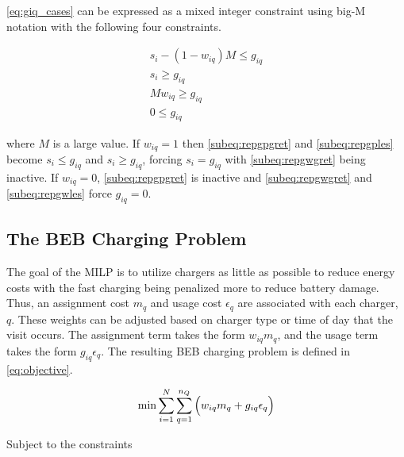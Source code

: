 \documentclass[11pt,a4paper,final]{article}
\begin{document}
\autoref{eq:giq_cases} can be expressed as a mixed integer constraint using big-M notation with the following four
constraints.

\begin{subequations}
    \label{eq:slack_gain}
\begin{align}
    s_i - (1 - w_{iq})M \leq g_{iq}  \label{subeq:repgpgret} \\
    s_i \geq g_{iq}                 \label{subeq:repgples} \\
    Mw_{iq} \geq g_{iq}              \label{subeq:repgwgret} \\
    0 \leq g_{iq}                   \label{subeq:repgwles}
\end{align}
\end{subequations}

\noindent
where \(M\) is a large value. If \(w_{iq} = 1\) then \autoref{subeq:repgpgret} and \autoref{subeq:repgples} become \(s_i \leq
g_{iq}\) and \(s_i \geq g_{iq}\), forcing \(s_i = g_{iq}\) with \autoref{subeq:repgwgret} being inactive. If \(w_{iq} = 0\),
\autoref{subeq:repgpgret} is inactive and \autoref{subeq:repgwgret} and \autoref{subeq:repgwles} force \(g_{iq} = 0\).

\subsection{The BEB Charging Problem}
\label{sec:BEB_MILP}
The goal of the MILP is to utilize chargers as little as possible to reduce energy costs with the fast charging being
penalized more to reduce battery damage. Thus, an assignment cost \(m_q\) and usage cost \(\epsilon_q\) are associated with each
charger, \(q\). These weights can be adjusted based on charger type or time of day that the visit occurs. The assignment
term takes the form \(w_{iq}m_q\), and the usage term takes the form \(g_{iq} \epsilon_q\). The resulting BEB charging problem is
defined in \autoref{eq:objective}.

\begin{equation}
\label{eq:objective}
	\min \sum_{i=1}^N \sum_{q=1}^{n_Q} \Big( w_{iq} m_q + g_{iq} \epsilon_q \Big) \\
\end{equation}

Subject to the constraints
\end{document}
